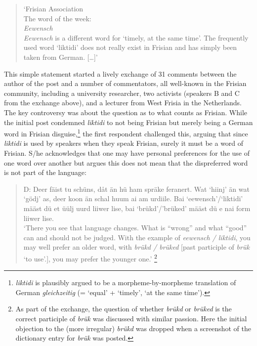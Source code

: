 \documentclass[output=paper]{langsci/langscibook}
\begin{document}
\begin{quote}
‘Frisian Association\smallskip\\\relax
The word of the week:\smallskip\\\relax
\textit{Eewensch}\smallskip\\\relax
\textit{Eewensch} is a different word for ‘timely, at the same time’. The frequently used word ‘liktidi’ does not really exist in Frisian and has simply been taken from German. […]’
\end{quote}

This simple statement started a lively exchange of 31 comments between the author of the post and a number of commentators, all well-known in the Frisian community, including a university researcher, two activists (speakers B and C from the exchange above), and a lecturer from West Frisia in the Netherlands. The key controversy was about the question as to what counts as Frisian. While the initial post condemned \textit{liktidi} to not being Frisian but merely being a German word in Frisian disguise,\footnote{\textit{liktidi} is plausibly argued to be a morpheme-by-morpheme translation of German \textit{gleichzeitig} (= ‘equal’ + ‘timely’, ‘at the same time’).} the first respondent challenged this, arguing that since \textit{liktidi} is used by speakers when they speak Frisian, surely it must be a word of Frisian. S/he acknowledges that one may have personal preferences for the use of one word over another but argues this does not mean that the dispreferred word is not part of the language:

\begin{quote}
D: Deer fäist tu schüns, dåt än hü ham spräke feranert. Wat ‘hiinj’ än wat ‘gödj’ as, deer koon än schal huum ai am urdiile. Bai ‘eewensch’/‘liktidi’ määst dü et üülj uurd liiwer lise, bai ‘brükd’/’brüked’ määst dü e nai form liiwer lise. \smallskip\\\relax
‘There you see that language changes. What is “wrong” and what “good” can and should not be judged. With the example of \textit{eewensch / liktidi}, you may well prefer an older word, with \textit{brükd / brüked} [past participle of \textit{brük} ‘to use’.], you may prefer the younger one.’
\footnote{As part of the exchange, the question of whether \textit{brükd} or \textit{brüked} is the correct participle of \textit{brük} was discussed with similar passion. Here the initial objection to the (more irregular) \textit{brükd} was dropped when a screenshot of the dictionary entry for \textit{brük} was posted.}\end{quote}
\end{document}
